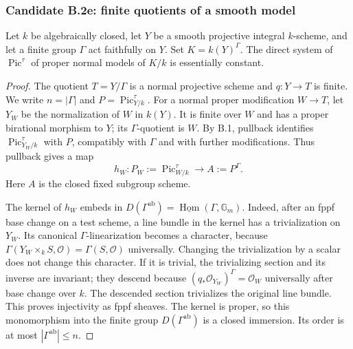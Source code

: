 \subsubsection*{Candidate B.2e: finite quotients of a smooth model}
Let $k$ be algebraically closed, let $Y$ be a smooth projective integral
$k$-scheme, and let a finite group $\Gamma$ act faithfully on $Y$.
Set $K=k(Y)^\Gamma$.  The direct system of
$\operatorname{Pic}^{\tau}$ of proper normal models of $K/k$ is
essentially constant.
\begin{proof}
The quotient $T=Y/\Gamma$ is a normal projective scheme and
$q:Y\to T$ is finite.  We write $n=|\Gamma|$ and
$P=\operatorname{Pic}^{\tau}_{Y/k}$.
For a normal proper modification $W\to T$, let $Y_W$ be the
normalization of $W$ in $k(Y)$.  It is finite over $W$ and has a
proper birational morphism to $Y$; its $\Gamma$-quotient is $W$.
By B.1, pullback identifies $\operatorname{Pic}^{\tau}_{Y_W/k}$
with $P$, compatibly with $\Gamma$ and with further modifications.
Thus pullback gives a map
\[
 h_W:P_W:=\operatorname{Pic}^{\tau}_{W/k}\longrightarrow
 A:=P^\Gamma.
\]
Here $A$ is the closed fixed subgroup scheme.

The kernel of $h_W$ embeds in
$D(\Gamma^{\mathrm{ab}})=\underline{\operatorname{Hom}}(\Gamma,\mathbb G_m)$.
Indeed, after an fppf base change on a test scheme, a line bundle in
the kernel has a trivialization on $Y_W$.  Its canonical
$\Gamma$-linearization becomes a character, because
$\Gamma(Y_W\times_kS,\mathcal O)=\Gamma(S,\mathcal O)$ universally.
Changing the trivialization by a scalar does not change this character.
If it is trivial, the trivializing section and its inverse are invariant;
they descend because $(q_*\mathcal O_{Y_W})^\Gamma=\mathcal O_W$
universally after base change over $k$.  The descended section
trivializes the original line bundle.  This proves injectivity as
fppf sheaves.  The kernel is proper, so this monomorphism into the
finite group $D(\Gamma^{\mathrm{ab}})$ is a closed immersion.
Its order is at most $|\Gamma^{\mathrm{ab}}|\le n$.


\end{proof}
